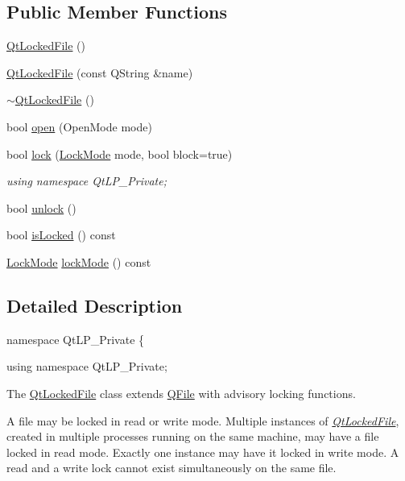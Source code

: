 \subsection*{Public Member Functions}
\begin{DoxyCompactItemize}
\item 
\hyperlink{class_qt_locked_file_a69bf1d82b1ca46f97466634d8f9587aa}{Qt\-Locked\-File} ()
\item 
\hyperlink{class_qt_locked_file_a8b7a228ae02dca4bb99743219d0cdb7b}{Qt\-Locked\-File} (const Q\-String \&name)
\item 
\hyperlink{class_qt_locked_file_ae22e087171c094da6cfb3282e838c9d4}{$\sim$\-Qt\-Locked\-File} ()
\item 
bool \hyperlink{class_qt_locked_file_a2e81bbaa7b1aaa83cf79284e66dbad79}{open} (Open\-Mode mode)
\item 
bool \hyperlink{class_qt_locked_file_af7876c08254a16d00022939f2fb9a8b8}{lock} (\hyperlink{class_qt_locked_file_aef385609a0a280b52334b972b04074cc}{Lock\-Mode} mode, bool block=true)
\begin{DoxyCompactList}\small\item\em using namespace Qt\-L\-P\-\_\-\-Private; \end{DoxyCompactList}\item 
bool \hyperlink{class_qt_locked_file_abb4d7e6211d9e6e14afaa661818fb2bf}{unlock} ()
\item 
bool \hyperlink{class_qt_locked_file_ac93115b12ddd6c3275a5a81a94b6c919}{is\-Locked} () const 
\item 
\hyperlink{class_qt_locked_file_aef385609a0a280b52334b972b04074cc}{Lock\-Mode} \hyperlink{class_qt_locked_file_aabfd6fb28f249a5fb01f3965de0e41f1}{lock\-Mode} () const 
\end{DoxyCompactItemize}


\subsection{Detailed Description}
namespace Qt\-L\-P\-\_\-\-Private \{ 

using namespace Qt\-L\-P\-\_\-\-Private;

The \hyperlink{class_qt_locked_file}{Qt\-Locked\-File} class extends \hyperlink{class_q_file}{Q\-File} with advisory locking functions.

A file may be locked in read or write mode. Multiple instances of {\itshape \hyperlink{class_qt_locked_file}{Qt\-Locked\-File}}, created in multiple processes running on the same machine, may have a file locked in read mode. Exactly one instance may have it locked in write mode. A read and a write lock cannot exist simultaneously on the same file.

